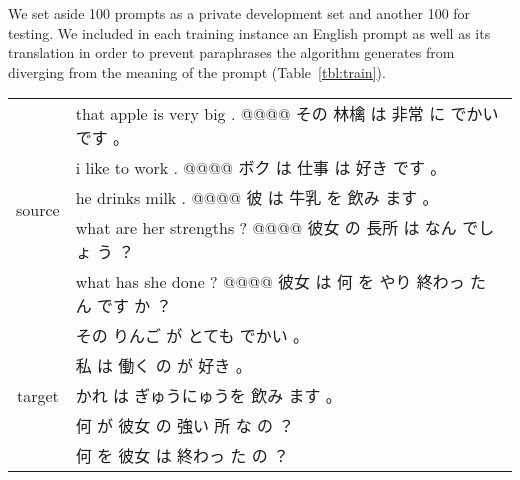 \documentclass[dvipdfmx,11pt,a4paper]{article}
\begin{document}
We set aside 100 prompts as a private development set and another 100 for testing.  We included in each training instance an English prompt as well as its translation in order to prevent paraphrases the algorithm generates  from diverging from the meaning of  the prompt (Table~\ref{tbl:train}).
\begin{table*}[t]

\caption{Training Instances. The source part of each input  consists of two sections: the first section contains a sentence in an original language, followed by a translation in a target language, demarcated by a separator `@@@@.`  \label{tbl:train}}
\begin{tabular}{|c|p{}|} \hline
\multirow{5}{*}{\sc source}&  
that apple is very big . @@@@ その 林檎 は 非常 に でかい です 。\\
& i like to work . @@@@ ボク は 仕事 は 好き です 。\\
&he drinks milk . @@@@ 彼 は 牛乳 を 飲み ます 。\\
& what are her strengths ? @@@@ 彼女 の 長所 は なん でしょ う ？\\
& what has she done ? @@@@ 彼女 は 何 を やり 終わっ た ん です か ？ \\ \hline\hline
\multirow{5}{*}{\sc target }&その りんご が とても でかい 。\\
&私 は 働く の が 好き 。\\
& かれ は ぎゅうにゅうを 飲み ます 。\\
&何 が 彼女 の 強い 所 な の ？\\
&何 を 彼女 は 終わっ た の ？\\ \hline


\end{tabular}
\end{table*}
\newcommand{\red}[1]{\textcolor{red}{#1}}
\newcommand{\blue}[1]{\textcolor{blue}{#1}}
\end{document}
